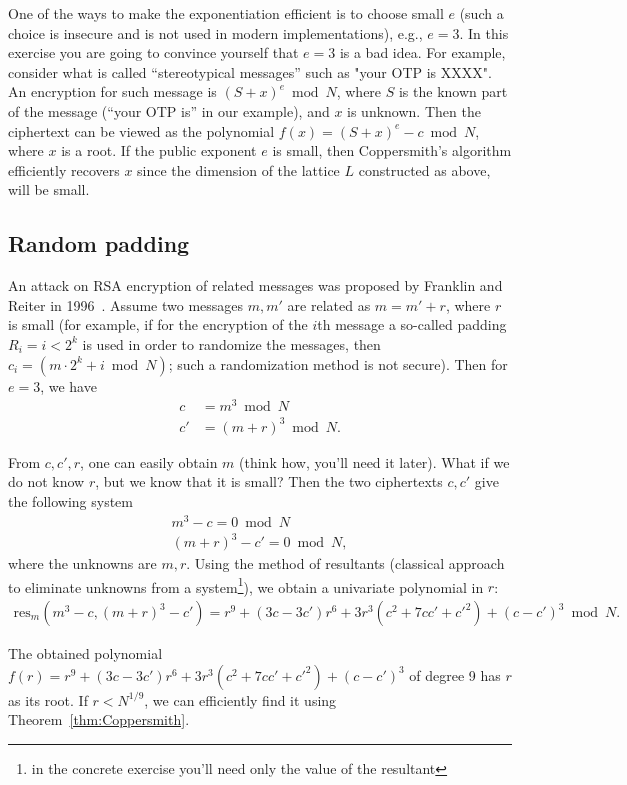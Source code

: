 \documentclass[11pt]{exam}
\theoremstyle{definition}
\begin{document}
One of the ways to make the exponentiation efficient is to choose small $e$ (such a choice is insecure and is not used in modern implementations), e.g., $e=3$. In this exercise you are going to convince yourself that $e=3$ is a bad idea.
For example, consider what is called ``stereotypical messages'' such as "your OTP is XXXX". An encryption for such message is  $(S+x)^e \bmod N$, where $S$ is the known part of the message (``your OTP is'' in our example), and $x$ is unknown. Then the ciphertext can be viewed as the polynomial $f(x) = (S+x)^e - c \bmod N$, where $x$ is a root. If the public exponent $e$ is small, then Coppersmith's algorithm efficiently recovers $x$ since the dimension of the lattice $L$ constructed as above, will be small.


\subsection{Random padding}

An attack on RSA encryption of related messages was proposed by Franklin and Reiter in 1996~\cite{FR96}. Assume two messages $m,m'$ are related as  $m = m'+r$, where $r$ is small (for example, if for the encryption of the $i$th message a so-called padding $R_i = i < 2^k$ is used in order to randomize the messages, then $c_i = (m\cdot 2^k + i \bmod N)$; such a randomization method is not secure). Then for $e=3$, we have 
	\begin{align*}
			c &= m^3 \bmod N \\
			c' &=(m+r)^3 \bmod N.
	\end{align*}

From $c, c', r$, one can easily obtain $m$ (think how, you'll need it later). What if we do not know $r$, but we know that it is small? Then the two ciphertexts $c, c'$ give the following system 
	\begin{align*}
		m^3 - c = 0 \bmod N \\
		(m+r)^3 - c' = 0\bmod N,
	\end{align*}
where the unknowns are $m,r$. Using the method of resultants (classical approach to eliminate unknowns from a system\footnote{in the concrete exercise you'll need only the value of the resultant}), we obtain a univariate polynomial in $r$:
	\begin{align*}
			\text{res}_m(m^3 - c, (m+r)^3 - c' ) = r^9 + (3c - 3c')r^6 + 3r^3(c^2 + 7cc'+c'^2) + (c-c')^3 \bmod N.
	\end{align*}

The obtained polynomial $f(r)=r^9 + (3c - 3c')r^6 + 3r^3(c^2 + 7cc'+c'^2) + (c-c')^3 $  of degree 9 has $r$ as its root. If $r < N^{1/9}$, we can efficiently find it using Theorem~\ref{thm:Coppersmith}.
\end{document}
